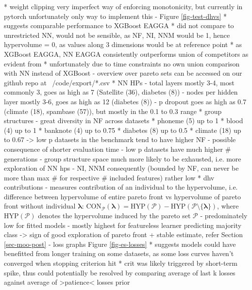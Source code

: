 \documentclass[twoside,11pt]{article}
\begin{document}
      * weight clipping very imperfect way of enforcing monotonicity, but currently in pytorch unfortunately only way to implement this
- Figure \ref{fig-test-dhvs}
  * suggests comparable performance to XGBoost EAGGA
  * did not compare to unrestricted NN, would not be sensible, as NF, NI, NNM would be 1, hence hypervolume = 0, as values along 3 dimensions would be at reference point
  * as XGBoost EAGGA, NN EAGGA consistently outperforms union of competitors as evident from \citep[Figure 2]{EAGGA}
  * unfortunately due to time constraints no own union comparison with NN instead of XGBoost
- overview over pareto sets can be accessed on our github repo at ~/code/export/*.csv
  * NN HPs
    - total layers mostly 3-4, most commonly 3, goes as high as 7 (Satellite (36), diabetes (8))
    - nodes per hidden layer mostly 3-6, goes as high as 12 (diabetes (8))
    - p dropout goes as high as 0.7 (climate (18), spambase (57)), but mostly in the 0.1 to 0.3 range
  * group structures
    - great diversity in NF across datasets
      * phoneme (5) up to 1
      * blood (4) up to 1
      * banknote (4) up to 0.75
      * diabetes (8) up to 0.5
      * climate (18) up to 0.67
      -> low p datasets in the benchmark tend to have higher NF
        - possible consequence of shorter evaluation time
        - low p datasets have much higher \# generations
        - group structure space much more likely to be exhausted, i.e. more exploration of NN hps
    - NI, NNM consequently (bounded by NF, can never be more than max \# for respective \# included features) rather low
  * dhv contributions
    - measures contribution of an individual to the hypervolume, i.e. difference between hypervolume of entire pareto front vs hypervolume of pareto front without
      individual $\boldsymbol\lambda$: $\text{CON}_{\mathcal{P}}(\boldsymbol\lambda)=\text{HYP}(\mathcal{P})-\text{HYP}(\mathcal{P}\setminus\{\boldsymbol\lambda\})$,
      where $\text{HYP}(\mathcal{P})$ denotes the hypervolume induced by the pareto set $\mathcal{P}$ \citep[p. 384]{10.5555/1943267.1943271}
    - predominately low for fitted models
    - mostly highest for featureless learner predicting majority class
    -> sign of good exploration of pareto front + stable estimate, refer Section \ref{sec-moo-post}
- loss graphs Figure \ref{fig-es-losses}
  * suggests models could have benefitted from longer training on some datasets, as some loss curves haven't converged when stopping criterion hit
  * crit was likely triggered by short-term spike, thus could potentially be resolved by comparing average of last k losses against average of >patience< losses prior
\end{document}
